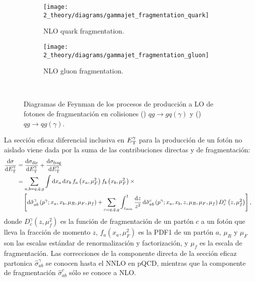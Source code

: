 \begin{figure}[ht!]
    \centering
    \begin{subfigure}[h]{0.49\linewidth}
        \centering
        \texttt{[image: 2\_theory/diagrams/gammajet\_fragmentation\_quark]}
        \caption{\ac{NLO} quark fragmentation.}
        \label{fig:theory:sm:prompt_photon:feynman_lo_frag:quark}
    \end{subfigure}
    \hfill
    \begin{subfigure}[h]{0.49\linewidth}
        \centering
        \texttt{[image: 2\_theory/diagrams/gammajet\_fragmentation\_gluon]}
        \caption{\ac{NLO} gluon fragmentation.}
        \label{fig:theory:sm:prompt_photon:feynman_lo_frag:gluon}
    \end{subfigure}\\
    \caption{Diagramas de Feynman de los procesos de producci\'on a \ac{LO} de fotones de fragmentaci\'on en colisiones \pp () \(qg \to g q(\gamma)\) y () \(qg \to q g(\gamma)\).}
    \label{fig:theory:sm:prompt_photon:feynman_lo_frag}
\end{figure}


La sección eficaz diferencial inclusiva en \(E_{\text{T}}^{\gamma}\) para la producción de un fotón no aislado viene dada por la suma de las contribuciones directas y de fragmentación:
\begin{align}
    \dv{\sigma}{\ensuremath{E_{\text{T}}^{\gamma}}} &= \dv{\sigma_{\text{dir}}}{\ensuremath{E_{\text{T}}^{\gamma}}} + \dv{\sigma_{\text{frag}}}{\ensuremath{E_{\text{T}}^{\gamma}}} \nonumber\\
    &= \sum_{a,b=q,\bar{q},g} \int \dd{x_a} \dd{x_b} f_a\left(x_a, \mu_F^2\right) f_b\left(x_b, \mu_F^2\right) \times \nonumber\\
    &\quad
    \left[
        \dd{\hat{\sigma}^{\gamma}_{ab} \left(p^{\gamma}; x_a, x_b, \mu_R, \mu_F, \mu_f\right)}
        +
        \sum_{c=q,\bar{q}, g} \int_{z_{\min}}^{1} \frac{\dd{z}}{z^2} \dd{\hat{\sigma}^c_{ab} \left(p^{\gamma}; x_a, x_b, z, \mu_R, \mu_F, \mu_f\right)} D_c^{\gamma} \left(z, \mu_f^2\right)
    \right],
\end{align}
donde \(D_c^{\gamma} \left(z,\mu_f^2\right)\) es la función de fragmentación de un part\'on \(c\) a un fotón que lleva la fracción de momento \(z\), \(f_a \left(x_a, \mu^2_F \right)\) es la \ac{PDF1} de un part\'on \(a\), \(\mu_R\) y \(\mu_F\) son las escalas estándar de renormalización y factorización, y \(\mu_f\) es la escala de fragmentación. Las correcciones de la componente directa de la sección eficaz partonica \(\hat{\sigma}^{\gamma}_{ab}\) se conocen hasta el \ac{NNLO} en \ac{pQCD}, mientras que la componente de fragmentación \(\hat{\sigma}^c_{ab}\) sólo se conoce a \ac{NLO}.


